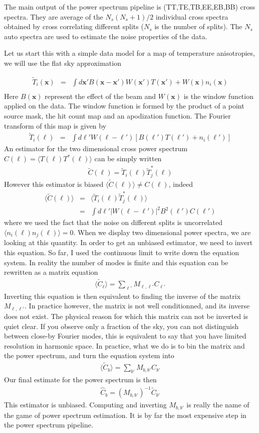 \documentclass[a4paper, 11pt]{article}
\def\ba{\begin{eqnarray}}
\def\ea{\end{eqnarray}}
\begin{document}
The main output of the power spectrum pipeline is  (TT,TE,TB,EE,EB,BB) cross spectra. They are average of the $N_{s}(N_{s}+1)/2$ individual cross spectra obtained by cross correlating different splits  ($N_{s}$ is the number of splits). The $N_{s}$ auto spectra are  used to estimate the noise properties of the data. 

Let us start this with a simple data model for a map of temperature anisotropies, we will use the flat sky approximation

\ba
\tilde{T}_{i}(\bm{x}) &=& \int d\bm{x'} B( \bm{x}-\bm{x'}) W(\bm{x'}) T(\bm{x'})+W( \bm{x}) n_{i} (\bm{x})  \\
\ea
Here $B( \bm{x})$ represent the effect of the beam and $W( \bm{x})$ is the window function applied on the data. The window function is formed by the product of a point source mask, the hit count map and an apodization function. The Fourier transform of this map is given by
\ba
\tilde{T}_{i}(\bm{\ell}) &=& \int d\bm{\ell'} W (\bm{\ell}-\bm{\ell'}) \left[ B(\bm{\ell'}) T(\bm{\ell'}) + n_{i}(\bm{\ell'})\right]
\ea
An estimator for the two dimensional cross power spectrum $C(\bm{\ell})=\langle T(\bm{\ell}) T^{*}(\bm{\ell}) \rangle $ can be simply written  
\ba
\tilde{C}(\bm{\ell})= \tilde{T}_{i}(\bm{\ell}) \tilde{T}^{*}_{j}(\bm{\ell})
\ea
However this estimator is biased $\langle \tilde{C}(\bm{\ell}) \rangle \neq C(\bm{\ell})$, indeed
\ba
\langle \tilde{C}(\bm{\ell}) \rangle &=& \langle  \tilde{T}_{i}(\bm{\ell}) \tilde{T}^{*}_{j}(\bm{\ell}) \rangle \\
&=& \int d\bm{\ell'} | W (\bm{\ell}-\bm{\ell'})|^{2}B^{2}(\bm{\ell'})  C(\bm{\ell'})
\ea
where we used the fact that the noise on different splits is uncorrelated $ \langle n_{i}(\bm{\ell}) n_{j}(\bm{\ell}) \rangle=0$. When we display two dimensional power spectra, we are looking at this quantity. In order to get an unbiased estimator, we need to invert this equation. So far, I used the continuous limit to write down the equation system. In reality the number of modes is finite and this equation can be rewritten as a matrix equation
\ba
\langle \tilde{C}_{\bm{\ell}} \rangle= \sum_{\bm{\ell}'} M_{\bm{\ell}, \bm{\ell'}}  C_{\bm{\ell'}}
\ea 
Inverting this equation is then equivalent to finding the inverse of the matrix $ M_{\bm{\ell}, \bm{\ell'}} $. In practice however, the matrix is not well conditionned, and its inverse does not exist. The physical reason for which this matrix can not be inverted is quiet clear. If you observe only a fraction of the sky, you can not distinguish between close-by Fourier modes, this is equivalent to say that you have limited resolution in harmonic space. In practice, what we do is to bin the matrix and the power spectrum, and turn the equation system into
\ba
\langle \tilde{C}_{b} \rangle= \sum_{b'} M_{b, b'}  C_{b'}
\ea 
Our final estimate for the power spectrum is then
\ba
\hat{C}_{b}= (M_{b, b'})^{-1} \tilde{C}_{b'} 
\ea
This estimator is unbiased. Computing and inverting $M_{b, b'}$ is really the name of the game of power spectrum estimation. It is by far the most expensive step in the power spectrum pipeline.
\end{document}
